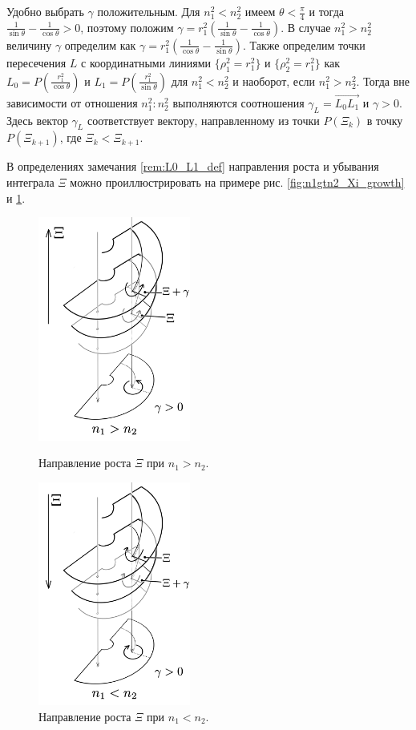 \begin{remark}
Удобно выбрать $\gamma$ положительным. Для $n_1^2 < n_2^2$ имеем $\theta < \frac{\pi}{4}$ и тогда $\frac{1}{\sin \theta} - \frac{1}{\cos \theta} > 0$, поэтому положим $\gamma =  r_1^2 \left( \frac{1}{\sin \theta} - \frac{1}{\cos \theta}  \right)$. В случае $n_1^2 > n_2^2$ величину $\gamma$ определим как $\gamma =  r_1^2 \left( \frac{1}{\cos \theta} - \frac{1}{\sin \theta}  \right)$.
Также определим точки пересечения $L$ с координатными линиями $\{ \rho_1^2 = r_1^2 \}$ и $\{ \rho_2^2 = r_1^2 \}$  как $L_0 = P(\frac{r_1^2}{\cos \theta})$ и  $L_1 = P(\frac{r_1^2}{\sin \theta})$ для $n_1^2 < n_2^2$ и наоборот, если $n_1^2>n_2^2$. 
Тогда вне зависимости от отношения $n_1^2 : n_2^2$ выполняются соотношения  $\gamma_L =  \overrightarrow{L_0 L_1}$ и $\gamma > 0$.
Здесь вектор $\gamma_L$ соответствует вектору, направленному из точки $P(\Xi_k)$ в точку $P(\Xi_{k+1})$, где $\Xi_k < \Xi_{k+1}$.
\label{rem:L0_L1_def}
\end{remark}

В определениях замечания \ref{rem:L0_L1_def} направления роста и убывания интеграла $\Xi$ можно проиллюстрировать на примере рис. \ref{fig:n1gtn2_Xi_growth} и \ref{fig:n1ltn2_Xi_growth}.
\begin{figure}[!htb]
\centering
\includegraphics[width=5cm]{images/ch4/section3_circular/n1gtn2.png}
    \caption{Направление роста $\Xi$ при $n_1 > n_2$.}
    \label{fig:n1gtn2_Xi_growth}
\endminipage\hfill
{}
\centering
\includegraphics[width=5cm]{images/ch4/section3_circular/n1ltn2.png}
    \caption{Направление роста $\Xi$ при $n_1 < n_2$.}
    \label{fig:n1ltn2_Xi_growth}
\endminipage\hfill
\end{figure}

